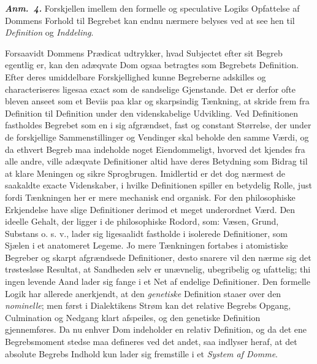 \documentclass[12pt]{book}
\newcommand{\anm}[1]{\emph{\textbf{Anm.~#1.}}}
\newcommand{\opage}[1]{\marginnote{\footnotesize\textit{[#1]}}}
\begin{document}
\anm{4} Forskjellen imellem den formelle og speculative Logiks Opfattelse af
Dommens Forhold til Begrebet kan endnu nærmere belyses ved at see hen til
\emph{Definition} og \emph{Inddeling}.

Forsaavidt Dommens Prædicat udtrykker, hvad Subjectet efter sit Begreb egentlig
er, kan den adæqvate Dom ogsaa betragtes som Begrebets Definition. Efter deres
umiddelbare Forskjellighed kunne Begreberne adskilles og characteriseres
\opage{63} ligesaa exact som de sandselige Gjenstande. Det er derfor ofte bleven anseet som
et Beviis paa klar og skarpsindig Tænkning, at skride frem fra Definition til
Definition under den videnskabelige Udvikling. Ved Definitionen fastholdes
Begrebet som en i sig afgrændset, fast og constant Størrelse, der under de
forskjellige Sammenstillinger og Vendinger skal beholde den samme Værdi, og da
ethvert Begreb maa indeholde noget Eiendommeligt, hvorved det kjendes fra alle
andre, ville adæqvate Definitioner altid have deres Betydning som Bidrag til at
klare Meningen og sikre Sprogbrugen. Imidlertid er det dog nærmest de saakaldte
exacte Videnskaber, i hvilke Definitionen spiller en betydelig Rolle, just fordi
Tænkningen her er mere mechanisk end organisk. For den philosophiske Erkjendelse
have slige Definitioner derimod et meget underordnet Værd. Den ideelle Gehalt, der
ligger i de philosophiske Rodord, som: Væsen, Grund, Substans o. s. v., lader sig
ligesaalidt fastholde i isolerede Definitioner, som Sjælen i et anatomeret Legeme.
Jo mere Tænkningen fortabes i atomistiske Begreber og skarpt afgrændsede
Definitioner, desto snarere vil den nærme sig det trøstesløse Resultat, at
Sandheden selv er unævnelig, ubegribelig og ufattelig; thi ingen levende Aand
lader sig fange i et Net af endelige Definitioner. Den formelle Logik har allerede
anerkjendt, at den \emph{genetiske} Definition staaer over den \emph{nominelle};
men først i Dialektikens Strøm kan det relative Begrebs Opgang, Culmination og
Nedgang klart afspeiles, og den genetiske Definition gjennemføres. Da nu enhver
Dom indeholder en relativ Definition, og da det ene Begrebsmoment stedse maa
defineres ved det andet, saa indlyser heraf, at det absolute Begrebs Indhold kun
lader sig fremstille i et \emph{System af Domme}.
\opage{64} %
\end{document}
